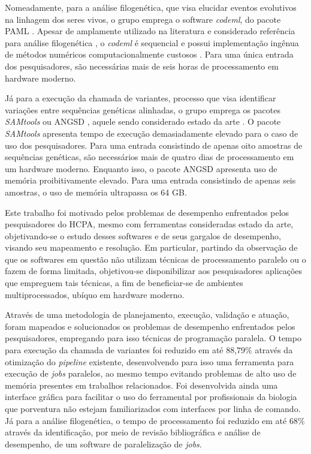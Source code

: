 \documentclass[cic,tc]{iiufrgs}
\begin{document}
Nomeadamente, para a análise filogenética, que visa elucidar eventos evolutivos
na linhagem dos seres vivos, o grupo emprega o software \textit{codeml}, do pacote
PAML \cite{yang2007paml}. Apesar de amplamente utilizado na literatura e
considerado referência para análise filogenética \cite{maldonado2016lmap}, o
\textit{codeml} é sequencial e possui implementação ingênua de métodos numéricos
computacionalmente custosos \cite{yang2020paml}. Para uma única entrada dos
pesquisadores, são necessárias mais de seis horas de processamento em hardware
moderno.

Já para a execução da chamada de variantes, processo que visa identificar
variações entre sequências genéticas alinhadas, o grupo emprega os pacotes
\textit{SAMtools} \cite{li2009sequence} ou ANGSD \cite{korneliussen2014angsd}, aquele
sendo considerado estado da
arte \cite{poplin2018universal} \cite{yao2020evaluation}. O pacote \textit{SAMtools}
apresenta tempo de execução demasiadamente elevado para o caso de uso dos
pesquisadores. Para uma entrada consistindo de apenas oito amostras de
sequências genéticas, são necessários mais de quatro dias de processamento em
um hardware moderno. Enquanto isso, o pacote ANGSD apresenta uso de memória
proibitivamente elevado. Para uma entrada consistindo de apenas seis amostras,
o uso de memória ultrapassa os 64 GB.

%
%
Este trabalho foi motivado pelos problemas de desempenho enfrentados pelos
pesquisadores do HCPA, mesmo com ferramentas consideradas estado da arte,
objetivando-se o estudo desses softwares e de seus gargalos de
desempenho, visando seu mapeamento e resolução. Em particular, partindo da
observação de que os softwares em questão não utilizam técnicas de
processamento paralelo ou o fazem de forma limitada, objetivou-se
disponibilizar aos pesquisadores aplicações que empreguem tais técnicas, a fim
de beneficiar-se de ambientes multiprocessados, ubíquo em hardware moderno.

%
%
Através de uma metodologia de planejamento, execução, validação e atuação,
foram mapeados e solucionados os problemas de desempenho enfrentados pelos
pesquisadores, empregando para isso técnicas de programação paralela. O tempo
para execução da chamada de variantes foi reduzido em até 88,79\% através da
otimização do \textit{pipeline} existente, desenvolvendo para isso uma
ferramenta para execução de \textit{jobs} paralelos, ao mesmo tempo evitando
problemas de alto uso de memória presentes em trabalhos relacionados. Foi
desenvolvida ainda uma interface gráfica para facilitar o uso do ferramental
por profissionais da biologia que porventura não estejam familiarizados com
interfaces por linha de comando. Já para a análise filogenética, o tempo de
processamento foi reduzido em até 68\% através da identificação, por meio de
revisão bibliográfica e análise de desempenho, de um software de paralelização
de \textit{jobs}.
\end{document}
